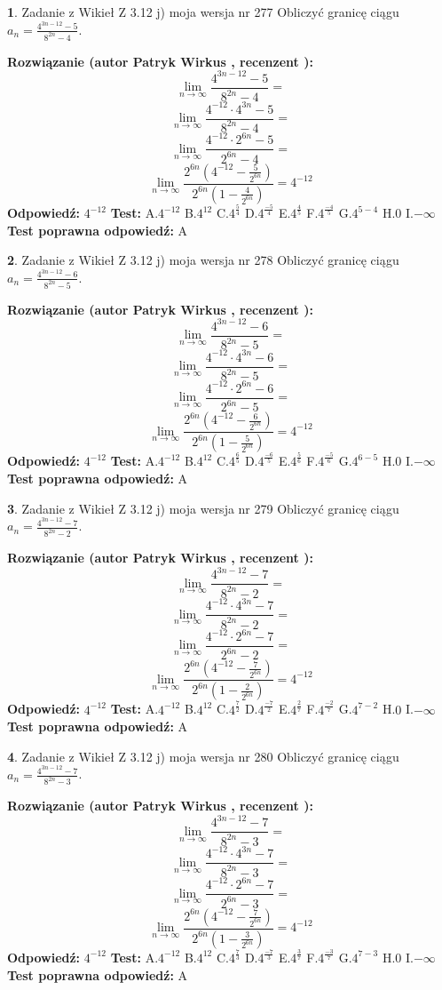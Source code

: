 \documentclass[12pt, a4paper]{article}
\theoremstyle{definition} %
\newtheorem{zad}{}
\newcommand{\zadStart}[1]{\begin{zad}#1\newline}
\newcommand{\zadStop}{\end{zad}}
\newcommand{\rozwStart}[2]{\noindent \textbf{Rozwiązanie (autor #1 , recenzent #2): }\newline}
\newcommand{\rozwStop}{\newline}
\newcommand{\odpStart}{\noindent \textbf{Odpowiedź:}\newline}
\newcommand{\odpStop}{\newline}
\newcommand{\testStart}{\noindent \textbf{Test:}\newline}
\newcommand{\testStop}{\newline}
\newcommand{\kluczStart}{\noindent \textbf{Test poprawna odpowiedź:}\newline}
\newcommand{\kluczStop}{\newline}
\begin{document}
\zadStart{Zadanie z Wikieł Z 3.12 j) moja wersja nr 277}
Obliczyć granicę ciągu $a_{n}=\frac{4^{3n-12}-5}{8^{2n}-4}$.
\zadStop
\rozwStart{Patryk Wirkus}{}
$$\lim\limits_{n\to\infty}\frac{4^{3n-12}-5}{8^{2n}-4}=$$
$$\lim\limits_{n\to\infty}\frac{4^{-12} \cdot 4^{3n}-5}{8^{2n}-4}=$$
$$\lim\limits_{n\to\infty}\frac{4^{-12} \cdot 2^{6n}-5}{2^{6n}-4}=$$
$$\lim\limits_{n\to\infty}\frac{2^{6n}(4^{-12} - \frac{5}{2^{6n}})}{2^{6n}(1-\frac{4}{2^{6n}})}= 4^{-12}$$
\rozwStop
\odpStart
$4^{-12}$
\odpStop
\testStart
A.$4^{-12}$
B.$4^{12}$
C.$4^{\frac{5}{4}}$
D.$4^{\frac{-5}{4}}$
E.$4^{\frac{4}{5}}$
F.$4^{\frac{-4}{5}}$
G.$4^{5-4}$
H.$0$
I.$-\infty$
\testStop
\kluczStart
A
\kluczStop



\zadStart{Zadanie z Wikieł Z 3.12 j) moja wersja nr 278}
Obliczyć granicę ciągu $a_{n}=\frac{4^{3n-12}-6}{8^{2n}-5}$.
\zadStop
\rozwStart{Patryk Wirkus}{}
$$\lim\limits_{n\to\infty}\frac{4^{3n-12}-6}{8^{2n}-5}=$$
$$\lim\limits_{n\to\infty}\frac{4^{-12} \cdot 4^{3n}-6}{8^{2n}-5}=$$
$$\lim\limits_{n\to\infty}\frac{4^{-12} \cdot 2^{6n}-6}{2^{6n}-5}=$$
$$\lim\limits_{n\to\infty}\frac{2^{6n}(4^{-12} - \frac{6}{2^{6n}})}{2^{6n}(1-\frac{5}{2^{6n}})}= 4^{-12}$$
\rozwStop
\odpStart
$4^{-12}$
\odpStop
\testStart
A.$4^{-12}$
B.$4^{12}$
C.$4^{\frac{6}{5}}$
D.$4^{\frac{-6}{5}}$
E.$4^{\frac{5}{6}}$
F.$4^{\frac{-5}{6}}$
G.$4^{6-5}$
H.$0$
I.$-\infty$
\testStop
\kluczStart
A
\kluczStop



\zadStart{Zadanie z Wikieł Z 3.12 j) moja wersja nr 279}
Obliczyć granicę ciągu $a_{n}=\frac{4^{3n-12}-7}{8^{2n}-2}$.
\zadStop
\rozwStart{Patryk Wirkus}{}
$$\lim\limits_{n\to\infty}\frac{4^{3n-12}-7}{8^{2n}-2}=$$
$$\lim\limits_{n\to\infty}\frac{4^{-12} \cdot 4^{3n}-7}{8^{2n}-2}=$$
$$\lim\limits_{n\to\infty}\frac{4^{-12} \cdot 2^{6n}-7}{2^{6n}-2}=$$
$$\lim\limits_{n\to\infty}\frac{2^{6n}(4^{-12} - \frac{7}{2^{6n}})}{2^{6n}(1-\frac{2}{2^{6n}})}= 4^{-12}$$
\rozwStop
\odpStart
$4^{-12}$
\odpStop
\testStart
A.$4^{-12}$
B.$4^{12}$
C.$4^{\frac{7}{2}}$
D.$4^{\frac{-7}{2}}$
E.$4^{\frac{2}{7}}$
F.$4^{\frac{-2}{7}}$
G.$4^{7-2}$
H.$0$
I.$-\infty$
\testStop
\kluczStart
A
\kluczStop



\zadStart{Zadanie z Wikieł Z 3.12 j) moja wersja nr 280}
Obliczyć granicę ciągu $a_{n}=\frac{4^{3n-12}-7}{8^{2n}-3}$.
\zadStop
\rozwStart{Patryk Wirkus}{}
$$\lim\limits_{n\to\infty}\frac{4^{3n-12}-7}{8^{2n}-3}=$$
$$\lim\limits_{n\to\infty}\frac{4^{-12} \cdot 4^{3n}-7}{8^{2n}-3}=$$
$$\lim\limits_{n\to\infty}\frac{4^{-12} \cdot 2^{6n}-7}{2^{6n}-3}=$$
$$\lim\limits_{n\to\infty}\frac{2^{6n}(4^{-12} - \frac{7}{2^{6n}})}{2^{6n}(1-\frac{3}{2^{6n}})}= 4^{-12}$$
\rozwStop
\odpStart
$4^{-12}$
\odpStop
\testStart
A.$4^{-12}$
B.$4^{12}$
C.$4^{\frac{7}{3}}$
D.$4^{\frac{-7}{3}}$
E.$4^{\frac{3}{7}}$
F.$4^{\frac{-3}{7}}$
G.$4^{7-3}$
H.$0$
I.$-\infty$
\testStop
\kluczStart
A
\kluczStop
\end{document}
